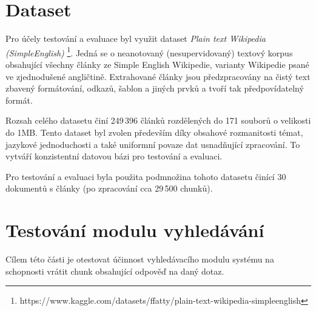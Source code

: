 \section{Dataset}
Pro účely testování a evaluace byl využit dataset \textit{Plain text Wikipedia (SimpleEnglish)} \footnote{https://www.kaggle.com/datasets/ffatty/plain-text-wikipedia-simpleenglish}. Jedná se o neanotovaný (nesupervidovaný) textový korpus obsahující všechny články ze Simple English Wikipedie, varianty Wikipedie psané ve zjednodušené angličtině. Extrahované články jsou předzpracovány na čistý text zbavený formátování, odkazů, šablon a jiných prvků a tvoří tak předpovídatelný formát.

Rozsah celého datasetu činí 249\,396 článků rozdělených do 171 souborů o velikosti do 1MB. Tento dataset byl zvolen především díky obsahové rozmanitosti témat, jazykové jednoduchosti a také uniformní povaze dat usnadňující zpracování. To vytváří konzistentní datovou bázi pro testování a evaluaci.

Pro testování a evaluaci byla použita podmnožina tohoto datasetu činící 30 dokumentů s články (po zpracování cca 29\,500 chunků).



\section{Testování modulu vyhledávání}

Cílem této části je otestovat účinnost vyhledávacího modulu systému na schopnosti vrátit chunk obsahující odpověď na daný dotaz.

